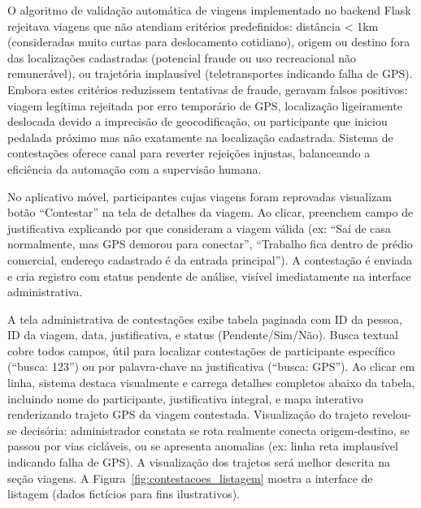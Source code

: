 

O algoritmo de validação automática de viagens implementado no backend Flask rejeitava viagens que não atendiam critérios predefinidos: distância < 1km (consideradas muito curtas para deslocamento cotidiano), origem ou destino fora das localizações cadastradas (potencial fraude ou uso recreacional não remunerável), ou trajetória implausível (teletransportes indicando falha de GPS). Embora estes critérios reduzissem tentativas de fraude, geravam falsos positivos: viagem legítima rejeitada por erro temporário de GPS, localização ligeiramente deslocada devido a imprecisão de geocodificação, ou participante que iniciou pedalada próximo mas não exatamente na localização cadastrada. Sistema de contestações oferece canal para reverter rejeições injustas, balanceando a eficiência da automação com a supervisão humana.

No aplicativo móvel, participantes cujas viagens foram reprovadas visualizam botão ``Contestar'' na tela de detalhes da viagem. Ao clicar, preenchem campo de justificativa explicando por que consideram a viagem válida (ex: ``Saí de casa normalmente, mas GPS demorou para conectar'', ``Trabalho fica dentro de prédio comercial, endereço cadastrado é da entrada principal''). A contestação é enviada e cria registro com status pendente de análise, visível imediatamente na interface administrativa.

A tela administrativa de contestações exibe tabela paginada com ID da pessoa, ID da viagem, data, justificativa, e status (Pendente/Sim/Não). Busca textual cobre todos campos, útil para localizar contestações de participante específico (``busca: 123'') ou por palavra-chave na justificativa (``busca: GPS''). Ao clicar em linha, sistema destaca visualmente e carrega detalhes completos abaixo da tabela, incluindo nome do participante, justificativa integral, e mapa interativo renderizando trajeto GPS da viagem contestada. Visualização do trajeto revelou-se decisória: administrador constata se rota realmente conecta origem-destino, se passou por vias cicláveis, ou se apresenta anomalias (ex: linha reta implausível indicando falha de GPS). A visualização dos trajetos será melhor descrita na seção viagens. A Figura~\ref{fig:contestacoes_listagem} mostra a interface de listagem (dados fictícios para fins ilustrativos).

